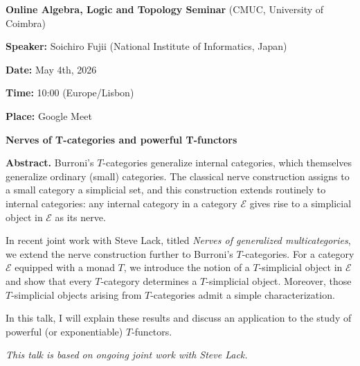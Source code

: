 \documentclass[11pt]{article}
\begin{document}
	
	\begin{center}
		{\Large \textbf{Online Algebra, Logic and Topology Seminar} (CMUC, University of Coimbra)}
	\end{center}
	
	\vspace{0.5cm}
	
	\noindent
	\textbf{Speaker:} Soichiro Fujii (National Institute of Informatics, Japan)
	
	\vspace{0.2cm}
	
	\noindent
	\textbf{Date:} May 4th, 2026
	
	\noindent
	\textbf{Time:} 10:00 (Europe/Lisbon)
	
	\noindent
	\textbf{Place:} Google Meet
	
	\vspace{0.5cm}
	
	\begin{center}
		{\Large \textbf{Nerves of T-categories and powerful T-functors}}
	\end{center}
	
	\vspace{0.5cm}
	
	\noindent
	\textbf{Abstract.}
	Burroni’s $T$-categories generalize internal categories, which themselves generalize ordinary (small) categories. The classical nerve construction assigns to a small category a simplicial set, and this construction extends routinely to internal categories: any internal category in a category $\mathcal{E}$ gives rise to a simplicial object in $\mathcal{E}$ as its nerve.
	
	In recent joint work with Steve Lack, titled \emph{Nerves of generalized multicategories}, we extend the nerve construction further to Burroni’s $T$-categories. For a category $\mathcal{E}$ equipped with a monad $T$, we introduce the notion of a $T$-simplicial object in $\mathcal{E}$ and show that every $T$-category determines a $T$-simplicial object. Moreover, those $T$-simplicial objects arising from $T$-categories admit a simple characterization.
	
	In this talk, I will explain these results and discuss an application to the study of powerful (or exponentiable) $T$-functors.
	
	\vspace{0.3cm}
	
	\noindent
	\textit{This talk is based on ongoing joint work with Steve Lack.}
	
\end{document}
